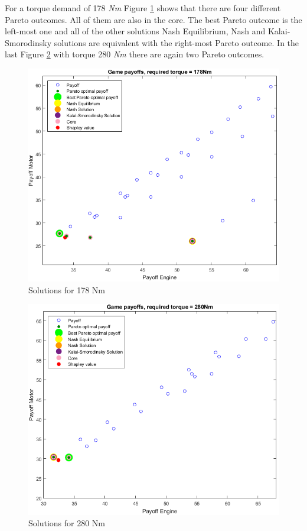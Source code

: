 For a torque demand of 178 \textit{Nm} Figure \ref{fig:178nm} shows that there are four different Pareto outcomes. All of them are also in the core. The best Pareto outcome is the left-most one and all of the other solutions Nash Equilibrium, Nash and Kalai-Smorodinsky solutions are equivalent with the right-most Pareto outcome. In the last Figure \ref{fig:280nm} with torque 280 \textit{Nm} there are again two Pareto outcomes.

\begin{figure}[h]
 	\centering
	\includegraphics[scale=0.57]{figures/gametheory/178nm}
	\caption{Solutions for 178 Nm}
	\label{fig:178nm}
\end{figure}

\begin{figure}[h]
  	\centering
	\includegraphics[scale=0.59]{figures/gametheory/280nm}
  	\caption{Solutions for 280 Nm}
  	\label{fig:280nm}
\end{figure}

